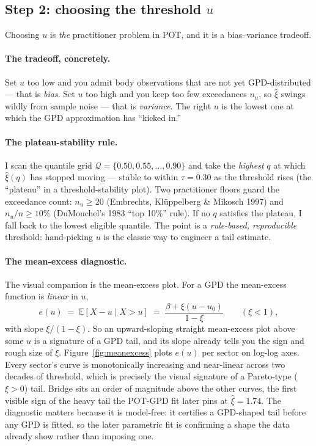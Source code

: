\documentclass[11pt]{article}
\theoremstyle{definition}
\theoremstyle{remark}
\theoremstyle{definition}
\newcommand{\E}{\mathbb{E}}
\newcommand{\1}{\mathbf{1}}
\begin{document}
\subsection{Step 2: choosing the threshold $u$}\label{sec:threshold}

Choosing $u$ is \emph{the} practitioner problem in POT, and it is a
bias--variance tradeoff.

\paragraph{The tradeoff, concretely.}
Set $u$ too low and you admit body observations that are not yet GPD-distributed
--- that is \emph{bias}. Set $u$ too high and you keep too few exceedances
$n_u$, so $\hat\xi$ swings wildly from sample noise --- that is \emph{variance}.
The right $u$ is the lowest one at which the GPD approximation has ``kicked
in.''

\paragraph{The plateau-stability rule.}
I scan the quantile grid $\mathcal{Q}=\{0.50,0.55,\dots,0.90\}$ and take the
\emph{highest} $q$ at which $\hat\xi(q)$ has stopped moving --- stable to within
$\tau=0.30$ as the threshold rises (the ``plateau'' in a threshold-stability
plot). Two practitioner floors guard the exceedance count: $n_u\ge 20$
(Embrechts, Kl\"uppelberg \& Mikosch 1997) and $n_u/n\ge 10\%$ (DuMouchel's
1983 ``top 10\%'' rule). If no $q$ satisfies the plateau, I fall back to the
lowest eligible quantile. The point is a \emph{rule-based, reproducible}
threshold: hand-picking $u$ is the classic way to engineer a tail estimate.

\paragraph{The mean-excess diagnostic.}
The visual companion is the mean-excess plot. For a GPD the mean-excess function
is \emph{linear} in $u$,
\[
e(u) \;=\; \E[X-u \mid X>u] \;=\; \frac{\beta+\xi(u-u_0)}{1-\xi}
\qquad (\xi<1),
\]
with slope $\xi/(1-\xi)$. So an upward-sloping straight mean-excess plot above
some $u$ is a signature of a GPD tail, and its slope already tells you the sign
and rough size of $\xi$. Figure~\ref{fig:meanexcess} plots $e(u)$ per sector on
log-log axes. Every sector's curve is monotonically increasing and near-linear
across two decades of threshold, which is precisely the visual signature of a
Pareto-type ($\xi>0$) tail. Bridge sits an order of magnitude above the other
curves, the first visible sign of the heavy tail the POT-GPD fit later pins at
$\hat\xi=1.74$. The diagnostic matters because it is model-free: it certifies a
GPD-shaped tail before any GPD is fitted, so the later parametric fit is
confirming a shape the data already show rather than imposing one.
\end{document}
